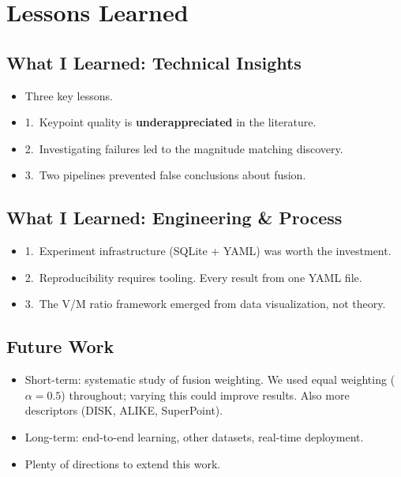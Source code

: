 \documentclass[11pt, letterpaper]{article}
\begin{document}
\section{Lessons Learned}

\subsection{What I Learned: Technical Insights}
\begin{itemize}
  \item Three key lessons.
  \item 1.\ Keypoint quality is \textbf{underappreciated} in the literature.
  \item 2.\ Investigating failures led to the magnitude matching discovery.
  \item 3.\ Two pipelines prevented false conclusions about fusion.
\end{itemize}

\subsection{What I Learned: Engineering \& Process}
\begin{itemize}
  \item 1.\ Experiment infrastructure (SQLite + YAML) was worth the investment.
  \item 2.\ Reproducibility requires tooling. Every result from one YAML file.
  \item 3.\ The V/M ratio framework emerged from data visualization, not theory.
\end{itemize}

\subsection{Future Work}
\begin{itemize}
  \item Short-term: systematic study of fusion weighting. We used equal weighting ($\alpha = 0.5$) throughout; varying this could improve results. Also more descriptors (DISK, ALIKE, SuperPoint).
  \item Long-term: end-to-end learning, other datasets, real-time deployment.
  \item Plenty of directions to extend this work.
\end{itemize}
\end{document}
